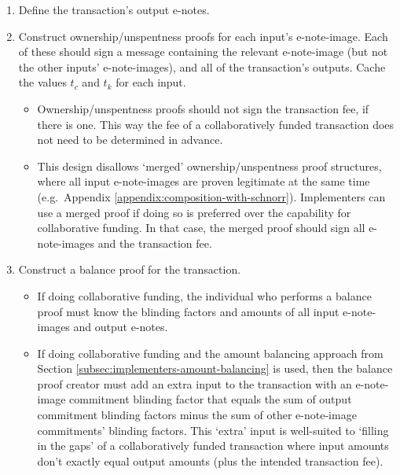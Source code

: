 \begin{enumerate}
    \item Define the transaction's output e-notes.

    \item Construct ownership/unspentness proofs for each input's e-note-image. Each of these should sign a message containing the relevant e-note-image (but not the other inputs' e-note-images), and all of the transaction's outputs. Cache the values $t_c$ and $t_k$ for each input.

    \begin{itemize}
        \item Ownership/unspentness proofs should not sign the transaction fee, if there is one. This way the fee of a collaboratively funded transaction does not need to be determined in advance.

        \item This design disallows `merged' ownership/unspentness proof structures, where all input e-note-images are proven legitimate at the same time (e.g.\ Appendix \ref{appendix:composition-with-schnorr}). Implementers can use a merged proof if doing so is preferred over the capability for collaborative funding. In that case, the merged proof should sign all e-note-images and the transaction fee.
    \end{itemize}

    \item Construct a balance proof for the transaction.

    \begin{itemize}
        \item If doing collaborative funding, the individual who performs a balance proof must know the blinding factors and amounts of all input e-note-images and output e-notes.
        
        \item If doing collaborative funding and the amount balancing approach from Section \ref{subsec:implementers-amount-balancing} is used, then the balance proof creator must add an extra input to the transaction with an e-note-image commitment blinding factor that equals the sum of output commitment blinding factors minus the sum of other e-note-image commitments' blinding factors. This `extra' input is well-suited to `filling in the gaps' of a collaboratively funded transaction where input amounts don't exactly equal output amounts (plus the intended transaction fee).
    \end{itemize}


\end{enumerate}
